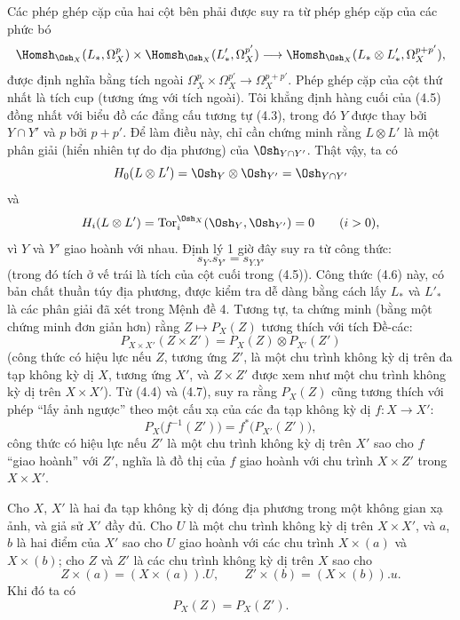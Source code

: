 Các phép ghép cặp của hai cột bên phải được suy ra từ phép ghép cặp của
các phức bó
\[
\Homsh_{\Osh_X}(L_{*},\Omega_X^{p})
\times\Homsh_{\Osh_X}(L'_{*},\Omega_X^{p'})
\longrightarrow
\Homsh_{\Osh_X}(L_{*}\otimes L'_{*},\Omega_X^{p+p'}),
\]
được định nghĩa bằng tích ngoài
$\Omega_X^{p}\times\Omega_X^{p'}\longrightarrow\Omega_X^{p+p'}$.
Phép ghép cặp của cột thứ nhất là tích cup (tương ứng với tích
ngoài). Tôi khẳng định hàng cuối của (4.5) đồng nhất với biểu đồ
các đẳng cấu tương tự (4.3), trong đó $Y$ được thay bởi $Y\cap Y'$ và $p$ bởi
$p+p'$. Để làm điều này, chỉ cần chứng minh rằng $L\otimes L'$ là một phân giải
(hiển nhiên tự do địa phương) của $\Osh_{Y\cap Y'}$. Thật vậy, ta có
\[
  H_0(L\otimes L')=\Osh_Y\otimes\Osh_{Y'}=\Osh_{Y\cap Y'}
\]
và
\[
  H_i(L\otimes L')=\operatorname{Tor}_{i}^{\Osh_X}(\Osh_Y,\Osh_{Y'})=0
  \qquad(i>0),
\]
vì $Y$ và $Y'$ giao hoành với nhau. Định lý 1 giờ đây suy ra
từ công thức:
\begin{equation}\tag{4.6}
  s_Y.s_{Y'}=s_{Y.Y'}
\end{equation}
(trong đó tích ở vế trái là tích của cột cuối trong (4.5)).
Công thức (4.6) này, có bản chất thuần túy địa phương, được kiểm tra dễ dàng
bằng cách lấy $L_{*}$ và $L'_{*}$ là các phân giải đã xét trong Mệnh đề
4. Tương tự, ta chứng minh (bằng một chứng minh đơn giản hơn) rằng
$Z\longmapsto P_X(Z)$ tương thích với tích Đề-các:
\begin{equation}\tag{4.7}
  P_{X\times X'}(Z\times Z')=P_X(Z)\otimes P_{X'}(Z')
\end{equation}
(công thức có hiệu lực nếu $Z$, tương ứng $Z'$, là một chu trình không kỳ dị trên đa tạp
không kỳ dị $X$, tương ứng $X'$, và $Z\times Z'$ được xem như một chu trình không
kỳ dị trên $X\times X'$). Từ (4.4) và (4.7), suy ra rằng $P_X(Z)$ cũng
tương thích với phép “lấy ảnh ngược” theo một cấu xạ của các đa tạp không
kỳ dị $f:X\longrightarrow X'$:
\begin{equation}\tag{4.8}
  P_X\bigl(f^{-1}(Z')\bigr)=f^{*}\bigl(P_{X'}(Z')\bigr),
\end{equation}
công thức có hiệu lực nếu $Z'$ là một chu trình không kỳ dị trên $X'$ sao cho $f$
“giao hoành” với $Z'$, nghĩa là đồ thị của $f$ giao hoành với chu trình
$X\times Z'$ trong $X\times X'$.


 Cho $X$, $X'$ là hai đa tạp không kỳ dị
đóng địa phương trong một không gian xạ ảnh, và giả sử $X'$ đầy đủ. Cho $U$
là một chu trình không kỳ dị trên $X\times X'$, và $a$, $b$ là hai điểm của $X'$ sao cho
$U$ giao hoành với các chu trình $X\times(a)$ và $X\times(b)$; cho $Z$
và $Z'$ là các chu trình không kỳ dị trên $X$ sao cho
\[
  Z\times(a)=(X\times(a)).U,
  \qquad
  Z'\times(b)=(X\times(b)).u.
\]
Khi đó ta có
\[
  P_X(Z)=P_X(Z').
\]


